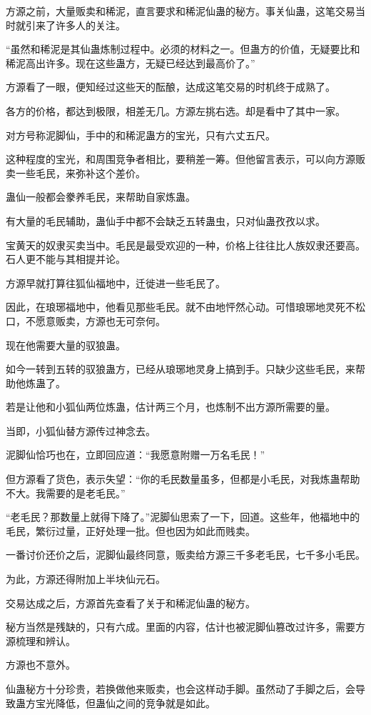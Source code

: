\begin{this_body}
方源之前，大量贩卖和稀泥，直言要求和稀泥仙蛊的秘方。事关仙蛊，这笔交易当时就引来了许多人的关注。

“虽然和稀泥是其仙蛊炼制过程中。必须的材料之一。但蛊方的价值，无疑要比和稀泥高出许多。现在这些蛊方，无疑已经达到最高价了。”

方源看了一眼，便知经过这些天的酝酿，达成这笔交易的时机终于成熟了。

各方的价格，都达到极限，相差无几。方源左挑右选。却是看中了其中一家。

对方号称泥脚仙，手中的和稀泥蛊方的宝光，只有六丈五尺。

这种程度的宝光，和周围竞争者相比，要稍差一筹。但他留言表示，可以向方源贩卖一些毛民，来弥补这个差价。

蛊仙一般都会豢养毛民，来帮助自家炼蛊。

有大量的毛民辅助，蛊仙手中都不会缺乏五转蛊虫，只对仙蛊孜孜以求。

宝黄天的奴隶买卖当中。毛民是最受欢迎的一种，价格上往往比人族奴隶还要高。石人更不能与其相提并论。

方源早就打算往狐仙福地中，迁徙进一些毛民了。

因此，在琅琊福地中，他看见那些毛民。就不由地怦然心动。可惜琅琊地灵死不松口，不愿意贩卖，方源也无可奈何。

现在他需要大量的驭狼蛊。

如今一转到五转的驭狼蛊方，已经从琅琊地灵身上搞到手。只缺少这些毛民，来帮助他炼蛊了。

若是让他和小狐仙两位炼蛊，估计两三个月，也炼制不出方源所需要的量。

当即，小狐仙替方源传过神念去。

泥脚仙恰巧也在，立即回应道：“我愿意附赠一万名毛民！”

但方源看了货色，表示失望：“你的毛民数量虽多，但都是小毛民，对我炼蛊帮助不大。我需要的是老毛民。”

“老毛民？那数量上就得下降了。”泥脚仙思索了一下，回道。这些年，他福地中的毛民，繁衍过量，正好处理一批。但也因为如此而贱卖。

一番讨价还价之后，泥脚仙最终同意，贩卖给方源三千多老毛民，七千多小毛民。

为此，方源还得附加上半块仙元石。

交易达成之后，方源首先查看了关于和稀泥仙蛊的秘方。

秘方当然是残缺的，只有六成。里面的内容，估计也被泥脚仙篡改过许多，需要方源梳理和辨认。

方源也不意外。

仙蛊秘方十分珍贵，若换做他来贩卖，也会这样动手脚。虽然动了手脚之后，会导致蛊方宝光降低，但蛊仙之间的竞争就是如此。


\end{this_body}
